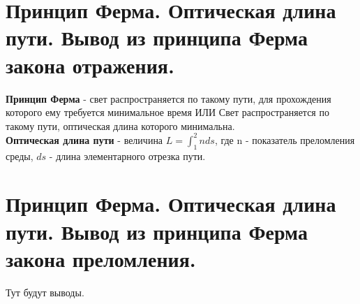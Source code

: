 \documentclass[14pt]{extarticle}
\begin{document}
\section{Принцип Ферма. Оптическая длина пути. Вывод из принципа Ферма закона
отражения.}
\textbf{Принцип Ферма} - свет распространяется по такому пути,
для прохождения которого ему требуется минимальное время ИЛИ 
Свет распространяется по такому пути, оптическая длина которого 
минимальна.\\
\textbf{Оптическая длина пути} - величина 
$L = \int_{1}^{2} n ds$, где n - показатель преломления 
среды, $ds$ - длина элементарного отрезка пути.
\section{Принцип Ферма. Оптическая длина пути. Вывод из принципа Ферма закона
преломления.} 
Тут будут выводы.
\end{document}
